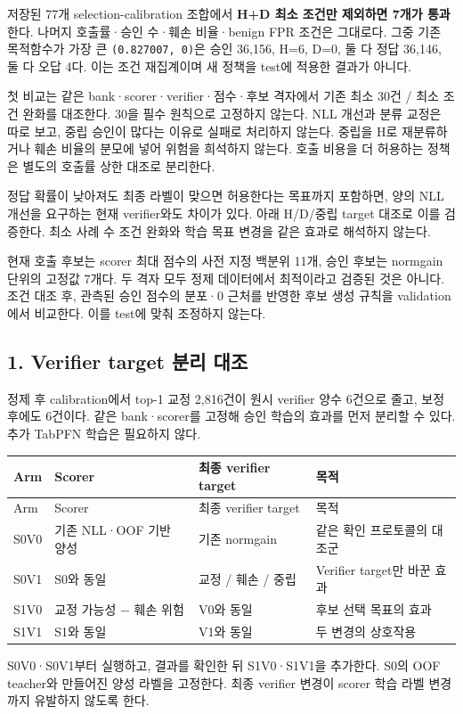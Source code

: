 저장된 77개 selection-calibration 조합에서 \textbf{H+\allowbreak{}D 최소 조건만 제외하면 7개가 통과}한다. 나머지 호출률·승인 수·훼손 비율·benign FPR 조건은 그대로다. 그중 기존 목적함수가 가장 큰 \texttt{(0.\allowbreak{}82700\allowbreak{}7,\allowbreak{} 0)}은 승인 36,156, H=\allowbreak{}6, D=\allowbreak{}0, 둘 다 정답 36,146, 둘 다 오답 4다. 이는 조건 재집계이며 새 정책을 test에 적용한 결과가 아니다.

첫 비교는 같은 bank·scorer·verifier·점수·후보 격자에서 기존 최소 30건 /\allowbreak{} 최소 조건 완화를 대조한다. 30을 필수 원칙으로 고정하지 않는다. NLL 개선과 분류 교정은 따로 보고, 중립 승인이 많다는 이유로 실패로 처리하지 않는다. 중립을 H로 재분류하거나 훼손 비율의 분모에 넣어 위험을 희석하지 않는다. 호출 비용을 더 허용하는 정책은 별도의 호출률 상한 대조로 분리한다.

정답 확률이 낮아져도 최종 라벨이 맞으면 허용한다는 목표까지 포함하면, 양의 NLL 개선을 요구하는 현재 verifier와도 차이가 있다. 아래 H/\allowbreak{}D/\allowbreak{}중립 target 대조로 이를 검증한다. 최소 사례 수 조건 완화와 학습 목표 변경을 같은 효과로 해석하지 않는다.

현재 호출 후보는 scorer 최대 점수의 사전 지정 백분위 11개, 승인 후보는 normgain 단위의 고정값 7개다. 두 격자 모두 정제 데이터에서 최적이라고 검증된 것은 아니다. 조건 대조 후, 관측된 승인 점수의 분포·0 근처를 반영한 후보 생성 규칙을 validation에서 비교한다. 이를 test에 맞춰 조정하지 않는다.

\subsection{1. Verifier target 분리 대조}
정제 후 calibration에서 top-1 교정 2,816건이 원시 verifier 양수 6건으로 줄고, 보정 후에도 6건이다. 같은 bank·scorer를 고정해 승인 학습의 효과를 먼저 분리할 수 있다. 추가 TabPFN 학습은 필요하지 않다.

\begingroup
\footnotesize
\begin{longtable}{>{\raggedright\arraybackslash}p{}>{\raggedright\arraybackslash}p{}>{\raggedright\arraybackslash}p{}>{\raggedright\arraybackslash}p{}}
\toprule
Arm & Scorer & 최종 verifier target & 목적 \\ \midrule
\endfirsthead
Arm & Scorer & 최종 verifier target & 목적 \\ \midrule
\endhead
{}S0V0 & 기존 NLL·OOF 기반 양성 & 기존 normgain & 같은 확인 프로토콜의 대조군 \\
{}S0V1 & S0와 동일 & 교정 /\allowbreak{} 훼손 /\allowbreak{} 중립 & Verifier target만 바꾼 효과 \\
{}S1V0 & 교정 가능성 − 훼손 위험 & V0와 동일 & 후보 선택 목표의 효과 \\
{}S1V1 & S1와 동일 & V1와 동일 & 두 변경의 상호작용 \\
\bottomrule
\end{longtable}
\endgroup
S0V0·S0V1부터 실행하고, 결과를 확인한 뒤 S1V0·S1V1을 추가한다. S0의 OOF teacher와 만들어진 양성 라벨을 고정한다. 최종 verifier 변경이 scorer 학습 라벨 변경까지 유발하지 않도록 한다.

